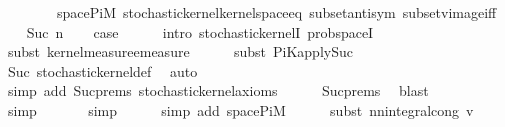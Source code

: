 \begin{isabellebody}
\ \ \ \ \ \ \ \ space{\isacharunderscore}{\kern0pt}PiM\ stochastic{\isacharunderscore}{\kern0pt}kernel{\isachardot}{\kern0pt}kernel{\isacharunderscore}{\kern0pt}space{\isacharunderscore}{\kern0pt}eq{\isacharunderscore}{\kern0pt}{}\ subset{\isacharunderscore}{\kern0pt}antisym\ subset{\isacharunderscore}{\kern0pt}vimage{\isacharunderscore}{\kern0pt}iff{\isacharparenright}{\kern0pt}\isanewline
{}\isamarkupfalse%
\isanewline
\ \ \isamarkupfalse%
\ {\isacharparenleft}{\kern0pt}Suc\ n{\isacharparenright}{\kern0pt}\isanewline
\ \ \isamarkupfalse%
\ {\isacharquery}{\kern0pt}case\isanewline
\ \ \ \ \isamarkupfalse%
\ {\isacharparenleft}{\kern0pt}intro\ stochastic{\isacharunderscore}{\kern0pt}kernelI\ prob{\isacharunderscore}{\kern0pt}spaceI{\isacharparenright}{\kern0pt}\isanewline
\ \ \ \ \isamarkupfalse%
\ {\isacharparenleft}{\kern0pt}subst\ kernel{\isacharunderscore}{\kern0pt}measure{\isacharunderscore}{\kern0pt}emeasure{\isacharparenright}{\kern0pt}\isanewline
\ \ \ \ \isamarkupfalse%
\ {\isacharparenleft}{\kern0pt}subst\ PiK{\isacharunderscore}{\kern0pt}apply{\isacharunderscore}{\kern0pt}Suc{\isacharparenright}{\kern0pt}\isanewline
\ \ \ \ \isamarkupfalse%
\ Suc\ stochastic{\isacharunderscore}{\kern0pt}kernel{\isacharunderscore}{\kern0pt}def\ \isamarkupfalse%
\ auto{\isacharbrackleft}{\kern0pt}{}{\isacharbrackright}{\kern0pt}\isanewline
\ \ \ \ \ \ \ \ \isamarkupfalse%
\ {\isacharparenleft}{\kern0pt}simp\ add{\isacharcolon}{\kern0pt}\ Suc{\isachardot}{\kern0pt}prems\ stochastic{\isacharunderscore}{\kern0pt}kernel{\isachardot}{\kern0pt}axioms{\isacharparenleft}{\kern0pt}{}{\isacharparenright}{\kern0pt}{\isacharparenright}{\kern0pt}\isanewline
\ \ \ \ \isamarkupfalse%
\ Suc{\isachardot}{\kern0pt}prems{\isacharparenleft}{\kern0pt}{}{\isacharparenright}{\kern0pt}\ \isamarkupfalse%
\ blast\isanewline
\ \ \ \ \ \ \isamarkupfalse%
\ simp\isanewline
\ \ \ \ \ \isamarkupfalse%
\ simp\isanewline
\ \ \ \ \isamarkupfalse%
\ {\isacharparenleft}{\kern0pt}simp\ add{\isacharcolon}{\kern0pt}\ space{\isacharunderscore}{\kern0pt}PiM{\isacharparenright}{\kern0pt}\isanewline
\ \ \ \ \isamarkupfalse%
\ {\isacharparenleft}{\kern0pt}subst\ nn{\isacharunderscore}{\kern0pt}integral{\isacharunderscore}{\kern0pt}cong{\isacharbrackleft}{\kern0pt}\ v{\isacharequal}{\kern0pt}{\isachardoublequoteopen}{\isacharparenleft}{\kern0pt}{\isasymlambda}{\isacharunderscore}{\kern0pt}{\isachardot}{\kern0pt}\ {}{\isacharparenright}{\kern0pt}{\isachardoublequoteclose}{\isacharbrackright}{\kern0pt}{\isacharparenright}{\kern0pt}\isanewline

\end{isabellebody}
